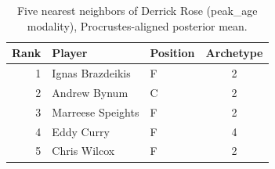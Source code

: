 \begin{table}[htbp]
  \centering\small
  \begin{tabular}{rllc}
    \toprule
    Rank & Player & Position & Archetype \\
    \midrule
    1 & Ignas Brazdeikis & F & 2 \\
    2 & Andrew Bynum & C & 2 \\
    3 & Marreese Speights & F & 2 \\
    4 & Eddy Curry & F & 4 \\
    5 & Chris Wilcox & F & 2 \\
    \bottomrule
  \end{tabular}
  \caption{Five nearest neighbors of Derrick Rose (peak_age modality), Procrustes-aligned posterior mean.}
  \label{tab:Derrick_Rose_neighbors_peak_age}
\end{table}

